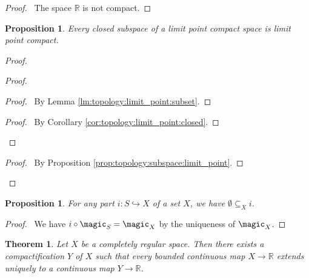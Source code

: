 \documentclass{report}
\let\qed\relax
\newtheorem{prop}[lm]{Proposition}
\newtheorem{thm}[lm]{Theorem}
\theoremstyle{definition}
\begin{document}
\begin{proof}
  \pf\ The space $\mathbb{R}$ is not compact. \qed
\end{proof}

\begin{prop}
  Every closed subspace of a limit point compact space is limit point compact.
\end{prop}

\begin{proof}
  \pf
  \begin{proof}
    \begin{proof}
      \pf\ By Lemma \ref{lm:topology:limit_point:subset}.
    \end{proof}
    \qedstep
    \begin{proof}
      \pf\ By Corollary \ref{cor:topology:limit_point:closed}.
    \end{proof}
  \end{proof}
  \begin{proof}
    \pf\ By Proposition \ref{prop:topology:subspace:limit_point}.
  \end{proof}
  \qed
\end{proof}

\begin{prop}
  For any part $i : S \hookrightarrow X$ of a set $X$, we have $\emptyset \subseteq_X i$.
\end{prop}

\begin{proof}
  \pf\ We have $i \circ \magic_S = \magic_X$ by the uniqueness of $\magic_X$. \qed
\end{proof}

\begin{thm}
  Let $X$ be a completely regular space. Then there exists a compactification $Y$ of $X$ such that every bounded continuous map $X \rightarrow \mathbb{R}$
  extends uniquely to a continuous map $Y \rightarrow \mathbb{R}$.
\end{thm}
\end{document}
